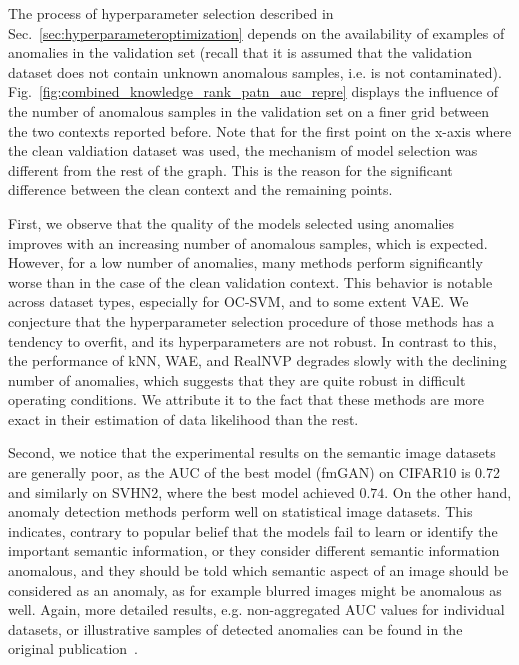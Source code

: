 The process of hyperparameter selection described in Sec.~\ref{sec:hyperparameteroptimization} depends on the availability of examples of anomalies in the validation set (recall that it is assumed that the validation dataset does not contain unknown anomalous samples, i.e. is not contaminated). Fig.~\ref{fig:combined_knowledge_rank_patn_auc_repre} displays the influence of the number of anomalous samples in the validation set on a finer grid between the two contexts reported before.  Note that for the first point on the x-axis where the clean valdiation dataset was used, the mechanism of model selection was different from the rest of the graph. This is the reason for the significant difference between the clean context and the remaining points.

First, we observe that the quality of the models selected using anomalies improves with an increasing number of anomalous samples, which is expected. However, for a low number of anomalies, many methods perform significantly worse than in the case of the clean validation context. This behavior is notable across dataset types, especially for OC-SVM, and to some extent VAE. We conjecture that the hyperparameter selection procedure of those methods has a tendency to overfit, and its hyperparameters are not robust. In contrast to this, the performance of kNN, WAE, and RealNVP degrades slowly with the declining number of anomalies, which suggests that they are quite robust in difficult operating conditions. We attribute it to the fact that these methods are more exact in their estimation of data likelihood than the rest. 

Second, we notice that the experimental results on the semantic image datasets are generally poor, as the AUC of the best model (fmGAN) on CIFAR10 is 0.72 and similarly on SVHN2, where the best model achieved $0.74$. On the other hand, anomaly detection methods perform well on statistical image datasets. This indicates, contrary to popular belief that the models fail to learn or identify the important semantic information, or they consider different semantic information anomalous, and they should be told which semantic aspect of an image should be considered as an anomaly, as for example blurred images might be anomalous as well. Again, more detailed results, e.g. non-aggregated AUC values for individual datasets, or illustrative samples of detected anomalies can be found in the original publication~\cite{vskvara2021comparison}.

